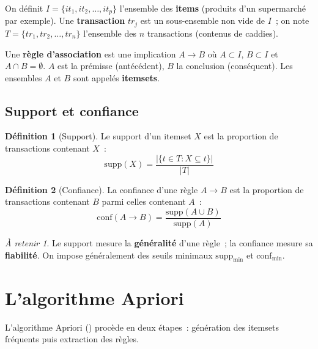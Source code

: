 \documentclass[a4paper,11pt]{article}
\theoremstyle{definition}
\newtheorem*{definition}{D\'efinition}
\theoremstyle{remark}
\newtheorem*{important}{\`A retenir}
\begin{document}
On d\'efinit $I = \{it_1, it_2, \dots, it_p\}$ l'ensemble des
\textbf{items} (produits d'un supermarch\'e par exemple). Une
\textbf{transaction} $tr_j$ est un sous-ensemble non vide de $I$~;
on note $T = \{tr_1, tr_2, \dots, tr_n\}$ l'ensemble des
$n$ transactions (contenus de caddies).

Une \textbf{r\`egle d'association} est une implication
$A \rightarrow B$ o\`u $A \subset I$, $B \subset I$ et
$A \cap B = \emptyset$. $A$ est la pr\'emisse (ant\'ec\'edent),
$B$ la conclusion (cons\'equent). Les ensembles $A$ et $B$ sont
appel\'es \textbf{itemsets}.

\subsection{Support et confiance}

\begin{definition}[Support]
  Le support d'un itemset $X$ est la proportion de transactions
  contenant $X$~:
  \begin{equation}
    \text{supp}(X) = \frac{|\{t \in T : X \subseteq t\}|}{|T|}
  \end{equation}
\end{definition}

\begin{definition}[Confiance]
  La confiance d'une r\`egle $A \rightarrow B$ est la proportion
  de transactions contenant $B$ parmi celles contenant $A$~:
  \begin{equation}
    \text{conf}(A \rightarrow B) = \frac{\text{supp}(A \cup B)}{\text{supp}(A)}
  \end{equation}
\end{definition}

\begin{important}
  Le support mesure la \textbf{g\'en\'eralit\'e} d'une r\`egle~;
  la confiance mesure sa \textbf{fiabilit\'e}. On impose
  g\'en\'eralement des seuils minimaux $\text{supp}_{\min}$ et
  $\text{conf}_{\min}$.
\end{important}

\section{L'algorithme Apriori}

L'algorithme Apriori (\cite{Agrawal1994}) proc\`ede en deux
\'etapes~: g\'en\'eration des itemsets fr\'equents puis extraction
des r\`egles.
\end{document}
